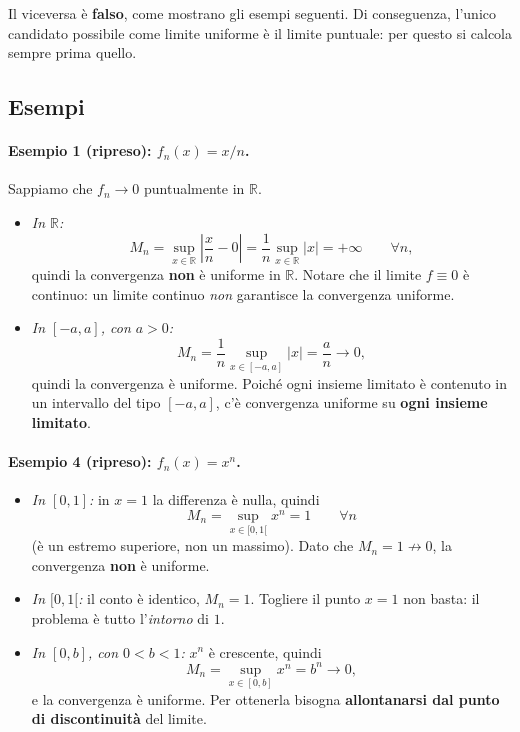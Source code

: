 \medskip
Il viceversa è \textbf{falso}, come mostrano gli esempi seguenti. Di conseguenza,
l'unico candidato possibile come limite uniforme è il limite puntuale: per
questo si calcola sempre prima quello.

\subsection{Esempi}

\paragraph{Esempio 1 (ripreso): $f_n(x) = x/n$.} Sappiamo che $f_n \to 0$
puntualmente in $\mathbb{R}$.
\begin{itemize}
  \item \emph{In $\mathbb{R}$:}
  \[
    M_n = \sup_{x \in \mathbb{R}} \left| \frac{x}{n} - 0 \right|
        = \frac{1}{n} \sup_{x \in \mathbb{R}} |x| = +\infty \qquad \forall n ,
  \]
  quindi la convergenza \textbf{non} è uniforme in $\mathbb{R}$. Notare che il
  limite $f \equiv 0$ è continuo: un limite continuo \emph{non} garantisce
  la convergenza uniforme.
  \item \emph{In $[-a, a]$, con $a > 0$:}
  \[
    M_n = \frac{1}{n} \sup_{x \in [-a,a]} |x| = \frac{a}{n} \longrightarrow 0 ,
  \]
  quindi la convergenza è uniforme. Poiché ogni insieme limitato è contenuto in
  un intervallo del tipo $[-a,a]$, c'è convergenza uniforme su \textbf{ogni
  insieme limitato}.
\end{itemize}

\paragraph{Esempio 4 (ripreso): $f_n(x) = x^n$.}
\begin{itemize}
  \item \emph{In $[0,1]$:} in $x = 1$ la differenza è nulla, quindi
  \[
    M_n = \sup_{x \in [0,1[} x^n = 1 \qquad \forall n
  \]
  (è un estremo superiore, non un massimo). Dato che $M_n = 1 \not\to 0$, la
  convergenza \textbf{non} è uniforme.
  \item \emph{In $[0,1[$:} il conto è identico, $M_n = 1$. Togliere il punto
  $x = 1$ non basta: il problema è tutto l'\emph{intorno} di $1$.
  \item \emph{In $[0,b]$, con $0 < b < 1$:} $x^n$ è crescente, quindi
  \[
    M_n = \sup_{x \in [0,b]} x^n = b^n \longrightarrow 0 ,
  \]
  e la convergenza è uniforme. Per ottenerla bisogna \textbf{allontanarsi dal
  punto di discontinuità} del limite.
\end{itemize}

